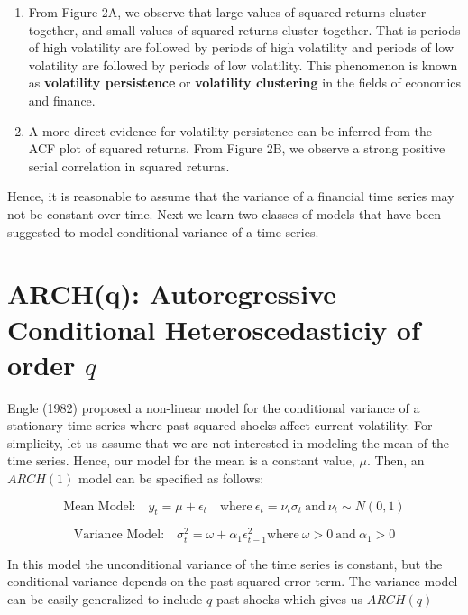 \documentclass[]{book}
\theoremstyle{definition}
\theoremstyle{definition}
\theoremstyle{definition}
\theoremstyle{remark}
\begin{document}
\begin{enumerate}
\def\labelenumi{\arabic{enumi}.}
\item
  From Figure 2A, we observe that large values of squared returns
  cluster together, and small values of squared returns cluster
  together. That is periods of high volatility are followed by periods
  of high volatility and periods of low volatility are followed by
  periods of low volatility. This phenomenon is known as
  \textbf{volatility persistence} or \textbf{volatility clustering} in
  the fields of economics and finance.
\item
  A more direct evidence for volatility persistence can be inferred from
  the ACF plot of squared returns. From Figure 2B, we observe a strong
  positive serial correlation in squared returns.
\end{enumerate}

Hence, it is reasonable to assume that the variance of a financial time
series may not be constant over time. Next we learn two classes of
models that have been suggested to model conditional variance of a time
series.

\hypertarget{archq-autoregressive-conditional-heteroscedasticiy-of-order-q}{%
\section{\texorpdfstring{ARCH(q): Autoregressive Conditional
Heteroscedasticiy of order
\(q\)}{ARCH(q): Autoregressive Conditional Heteroscedasticiy of order q}}\label{archq-autoregressive-conditional-heteroscedasticiy-of-order-q}}

Engle (1982) proposed a non-linear model for the conditional variance of
a stationary time series where past squared shocks affect current
volatility. For simplicity, let us assume that we are not interested in
modeling the mean of the time series. Hence, our model for the mean is a
constant value, \(\mu\). Then, an \(ARCH(1)\) model can be specified as
follows:

\[\text{Mean Model:} \quad y_t = \mu +\epsilon_t \quad \text{where} \ \epsilon_t=\nu_t  \sigma_t \ \text{and} \ \nu_t\sim N(0,1)\]

\[\text{Variance Model:} \quad  \sigma_t^2=\omega +\alpha_1 \epsilon_{t-1}^2 \text{where} \ \omega>0 \ \text{and} \ \alpha_1>0 \]

In this model the unconditional variance of the time series is constant,
but the conditional variance depends on the past squared error term. The
variance model can be easily generalized to include \(q\) past shocks
which gives us \(ARCH(q)\)
\end{document}

